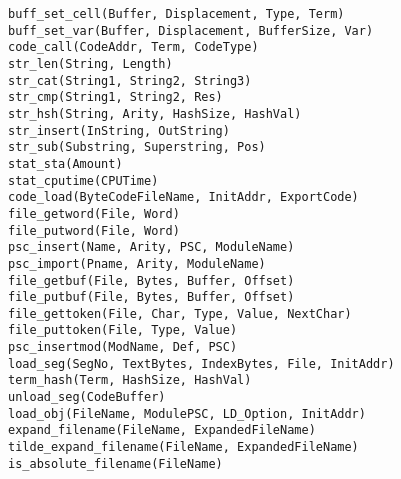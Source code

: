 \begin{tabbing}
 \> {\tt buff\_set\_cell(Buffer, Displacement, Type, Term)} \>	\\
 \> {\tt buff\_set\_var(Buffer, Displacement, BufferSize, Var)}	\>	\\
 \> {\tt code\_call(CodeAddr, Term, CodeType)}	\>		\\
 \> {\tt str\_len(String, Length)}		\>		\\
 \> {\tt str\_cat(String1, String2, String3)}	\>		\\
 \> {\tt str\_cmp(String1, String2, Res)}	\>		\\
 \> {\tt str\_hsh(String, Arity, HashSize, HashVal)} \>		\\
 \> {\tt str\_insert(InString, OutString)}	\>		\\
 \> {\tt str\_sub(Substring, Superstring, Pos)}	\>		\\
 \> {\tt stat\_sta(Amount)}			\>		\\
 \> {\tt stat\_cputime(CPUTime)}		\>		\\
 \> {\tt code\_load(ByteCodeFileName, InitAddr, ExportCode)} \>	\\
 \> {\tt file\_getword(File, Word)}		\>		\\
 \> {\tt file\_putword(File, Word)}		\>		\\
 \> {\tt psc\_insert(Name, Arity, PSC, ModuleName)} \>		\\
 \> {\tt psc\_import(Pname, Arity, ModuleName)}	\>		\\
 \> {\tt file\_getbuf(File, Bytes, Buffer, Offset)} \>		\\
 \> {\tt file\_putbuf(File, Bytes, Buffer, Offset)} \>		\\
 \> {\tt file\_gettoken(File, Char, Type, Value, NextChar)} \>	\\
 \> {\tt file\_puttoken(File, Type, Value)}	\>		\\
 \> {\tt psc\_insertmod(ModName, Def, PSC)}	\>		\\
 \> {\tt load\_seg(SegNo, TextBytes, IndexBytes, File, InitAddr)} \> \\
 \> {\tt term\_hash(Term, HashSize, HashVal)}	\>		\\
 \> {\tt unload\_seg(CodeBuffer)}		\>		\\
 \> {\tt load\_obj(FileName, ModulePSC, LD\_Option, InitAddr)} \> \\
 \> {\tt expand\_filename(FileName, ExpandedFileName)} \>	\\
 \> {\tt tilde\_expand\_filename(FileName, ExpandedFileName)} \>	\\
 \> {\tt is\_absolute\_filename(FileName)} \>	\\

\end{tabbing}
